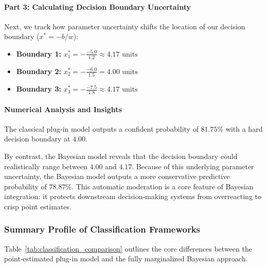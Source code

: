 \documentclass{article}
\begin{document}
\paragraph{Part 3: Calculating Decision Boundary Uncertainty}
Next, we track how parameter uncertainty shifts the location of our decision boundary ($x^* = -b/w$):
\begin{itemize}
    \item \textbf{Boundary 1:} $x^*_1 = -\frac{-5.0}{1.2} \approx 4.17\text{ units}$
    \item \textbf{Boundary 2:} $x^*_2 = -\frac{-6.0}{1.5} = 4.00\text{ units}$
    \item \textbf{Boundary 3:} $x^*_3 = -\frac{-7.5}{1.8} \approx 4.17\text{ units}$
\end{itemize}

\paragraph{Numerical Analysis and Insights}
The classical plug-in model outputs a confident probability of $81.75\%$ with a hard decision boundary at $4.00$. 

By contrast, the Bayesian model reveals that the decision boundary could realistically range between $4.00$ and $4.17$. Because of this underlying parameter uncertainty, the Bayesian model outputs a more conservative predictive probability of $78.87\%$. This automatic moderation is a core feature of Bayesian integration: it protects downstream decision-making systems from overreacting to crisp point estimates.

\subsubsection{Summary Profile of Classification Frameworks}
Table~\ref{tab:classification_comparison} outlines the core differences between the point-estimated plug-in model and the fully marginalized Bayesian approach.

\begin{table}[htbp]
\centering
\small
\renewcommand{\arraystretch}{1.4}
\caption{Structural Comparison of Plug-In vs. Bayesian Paradigms in Logistic Regression}
\label{tab:classification_comparison}
\end{table}
\end{document}
